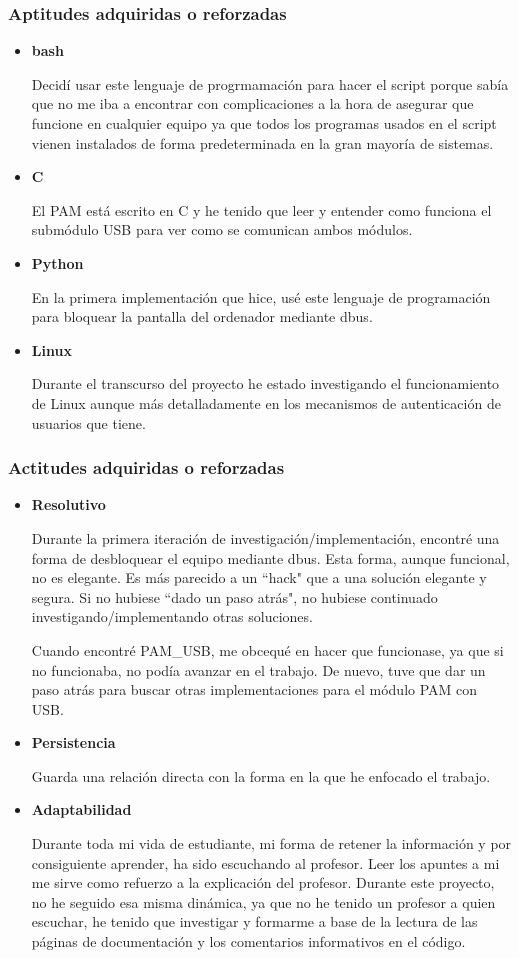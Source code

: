 \documentclass[titlepage, 12pt, a4paper]{article}
\begin{document}
\subsubsection{Aptitudes adquiridas o reforzadas}
\begin{itemize}
	\item{\textbf{\Gls{bash}}}\par Decidí usar este lenguaje de progrmamación para hacer el script porque sabía que no me iba a encontrar con complicaciones a la hora de asegurar que funcione en cualquier equipo ya que todos los programas usados en el script vienen instalados de forma predeterminada en la gran mayoría de sistemas.
	\item{\textbf{\Gls{C}}}\par El \Gls{PAM} está escrito en \Gls{C} y he tenido que leer y entender como funciona el submódulo USB para ver como se comunican ambos módulos.
	\item{\textbf{\Gls{Python}}}\par En la primera implementación que hice, usé este lenguaje de programación para bloquear la pantalla del ordenador mediante \Gls{dbus}.
	\item{\textbf{\Gls{Linux}}}\par Durante el transcurso del proyecto he estado investigando el funcionamiento de \Gls{Linux} aunque más detalladamente en los mecanismos de autenticación de usuarios que tiene.
\end{itemize}
\subsubsection{Actitudes adquiridas o reforzadas}
\begin{itemize}
	\item{\textbf{Resolutivo}}\par Durante la primera iteración de investigación/implementación, encontré una forma de desbloquear el equipo mediante \Gls{dbus}. Esta forma, aunque funcional, no es elegante. Es más parecido a un ``hack" que a una solución elegante y segura. Si no hubiese ``dado un paso atrás", no hubiese continuado investigando/implementando otras soluciones. \par Cuando encontré PAM\_USB, me obcequé en hacer que funcionase, ya que si no funcionaba, no podía avanzar en el trabajo. De nuevo, tuve que dar un paso atrás para buscar otras implementaciones para el módulo \Gls{PAM} con \Gls{USB}.
	\item{\textbf{Persistencia}}\par Guarda una relación directa con la forma en la que he enfocado el trabajo.
	\item{\textbf{Adaptabilidad}}\par Durante toda mi vida de estudiante, mi forma de retener la información y por consiguiente aprender, ha sido escuchando al profesor. Leer los apuntes a mi me sirve como refuerzo a la explicación del profesor. Durante este proyecto, no he seguido esa misma dinámica, ya que no he tenido un profesor a quien escuchar, he tenido que investigar y formarme a base de la lectura de las páginas de documentación y los comentarios informativos en el código.
\end{itemize}
\end{document}
